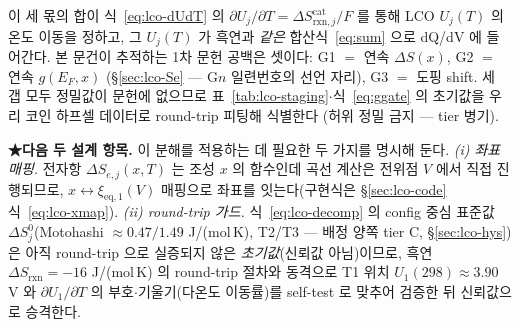 \documentclass[11pt,a4paper]{article}
\newcommand{\eq}{\mathrm{eq}}
\newcommand{\rxn}{\mathrm{rxn}}
\begin{document}
이 세 몫의 합이 식~\eqref{eq:lco-dUdT} 의 $\partial U_j/\partial T=\Delta S_{\rxn,j}^\mathrm{cat}/F$ 를 통해 LCO
$U_j(T)$ 의 온도 이동을 정하고, 그 $U_j(T)$ 가 흑연과 \emph{같은} 합산식~\eqref{eq:sum} 으로 dQ/dV 에 들어간다.
본 문건이 추적하는 1차 문헌 공백은 셋이다: G1 $=$ 연속 $\Delta S(x)$, G2 $=$ 연속 $g(E_F,x)$
(\S\ref{sec:lco-Se} — G$n$ 일련번호의 선언 자리), G3 $=$ 도핑 shift. 세 갭 모두 정밀값이 문헌에 없으므로
표~\ref{tab:lco-staging}$\cdot$식~\eqref{eq:ggate} 의 초기값을 우리 코인 하프셀 데이터로 round-trip 피팅해 식별한다
(허위 정밀 금지 — tier 병기).

\textbf{★다음 두 설계 항목.} 이 분해를 적용하는 데 필요한 두 가지를 명시해 둔다.
\emph{(i) 좌표 매핑.} 전자항 $\Delta S_{e,j}(x,T)$ 는 조성 $x$ 의 함수인데 곡선 계산은 전위점 $V$ 에서 직접 진행되므로,
$x\!\leftrightarrow\!\xi_{\eq,1}(V)$ 매핑으로 좌표를 잇는다(구현식은 \S\ref{sec:lco-code} 식~\eqref{eq:lco-xmap}). \emph{(ii) round-trip 가드.} 식~\eqref{eq:lco-decomp} 의 config 중심 표준값
$\Delta S_j^0$(Motohashi\cite{motohashi2009} $\approx0.47/1.49$ J/(mol\,K), T2/T3 — 배정 양쪽 tier C,
\S\ref{sec:lco-hys})은 아직 round-trip 으로 실증되지 않은
\emph{초기값}(신뢰값 아님)이므로, 흑연 $\Delta S_\rxn{=}-16$ J/(mol\,K) 의 round-trip 절차와 동격으로 T1 위치
$U_1(298)\approx3.90$ V 와 $\partial U_1/\partial T$ 의 부호$\cdot$기울기(다온도 이동률)를 self-test 로 맞추어
검증한 뒤 신뢰값으로 승격한다.
\end{document}
